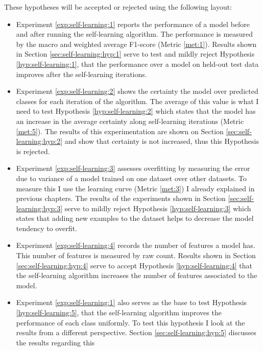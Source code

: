 These hypotheses will be accepted or rejected using the following layout:

\begin{itemize}
  \item Experiment \ref{exp:self-learning:1} reports the performance of a model
    before and after running the self-learning algorithm. The performance is
    measured by the macro and weighted average F1-score (Metric \ref{met:1}).
    Results shown in Section \ref{sec:self-learning:hyp:1} serve to test and
    mildly reject Hypothesis \ref{hyp:self-learning:1}, that the performance
    over a model on held-out test data improves after the self-learning
    iterations.
  \item Experiment \ref{exp:self-learning:2} shows the certainty the model over
    predicted classes for each iteration of the algorithm. The average of this
    value is what I need to test Hypothesis \ref{hyp:self-learning:2} which
    states that the model has an increase in the average certainty along
    self-learning iterations (Metric \ref{met:5}). The results of this
    experimentation are shown on Section \ref{sec:self-learning:hyp:2} and show
    that certainty is not increased, thus this Hypothesis is rejected.
  \item Experiment \ref{exp:self-learning:3} assesses overfitting by measuring
    the error due to variance of a model trained on one dataset over other
    datasets. To measure this I use the learning curve (Metric \ref{met:3}) I
    already explained in previous chapters. The results of the experiments
    shown in Section \ref{sec:self-learning:hyp:3} serve to mildly reject
    Hypothesis \ref{hyp:self-learning:3} which states that adding new examples
    to the dataset helps to decrease the model tendency to overfit. 
  \item Experiment \ref{exp:self-learning:4} records the number of features a
    model has. This number of features is measured by raw count. Results shown
    in Section \ref{sec:self-learning:hyp:4} serve to accept Hypothesis
    \ref{hyp:self-learning:4} that the self-learning algorithm increases the
    number of features associated to the model.
  \item Experiment \ref{exp:self-learning:1} also serves as the base to test
    Hypothesis \ref{hyp:self-learning:5}, that the self-learning algorithm
    improves the performance of each class uniformly. To test this hypothesis I
    look at the results from a different perspective. Section
    \ref{sec:self-learning:hyp:5} discusses the results regarding this

\end{itemize}
